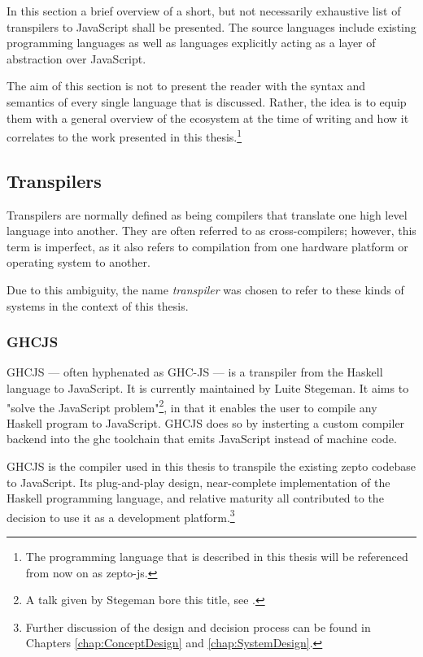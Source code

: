 \documentclass[oneside,11pt,xetex]{scrbook}
\begin{document}
In this section a brief overview of a short, but not necessarily exhaustive list of
transpilers to JavaScript shall be presented. The source languages include
existing programming languages as well as languages explicitly acting as
a layer of abstraction over JavaScript.

The aim of this section is not to present the reader with the syntax and semantics
of every single language that is discussed. Rather, the idea is to equip them with a
general overview of the ecosystem at the time of writing and how it correlates to
the work presented in this thesis.\footnote{The programming language that is described
in this thesis will be referenced from now on as zepto-js.}

\subsection{Transpilers}
\label{trans}

Transpilers are normally defined as being compilers that translate one high level language
into another. They are often referred to as cross-compilers; however, this term is imperfect,
as it also refers to compilation from one hardware platform or operating system to
another.

Due to this ambiguity, the name \textit{transpiler} was chosen to refer to these
kinds of systems in the context of this thesis.

\subsubsection{GHCJS}
\label{sec:GHCJS}

GHCJS --- often hyphenated as GHC-JS --- is a transpiler from the Haskell language
to JavaScript. It is currently maintained by Luite Stegeman. It aims to "solve
the JavaScript problem"\footnote{A talk given by Stegeman bore this title, see
\parencite{STEG}.}, in that it enables the user to compile any Haskell program to JavaScript.
GHCJS does so by insterting a custom compiler backend into the \gls{ghc} toolchain
that emits JavaScript instead of machine code.

GHCJS is the compiler used in this thesis to transpile the existing zepto codebase
to JavaScript. Its plug-and-play design, near-complete implementation of the
Haskell programming language, and relative maturity all contributed to the decision
to use it as a development platform.\footnote{Further discussion of the design
and decision process can be found in Chapters \ref{chap:ConceptDesign} and
\ref{chap:SystemDesign}.}
\end{document}
